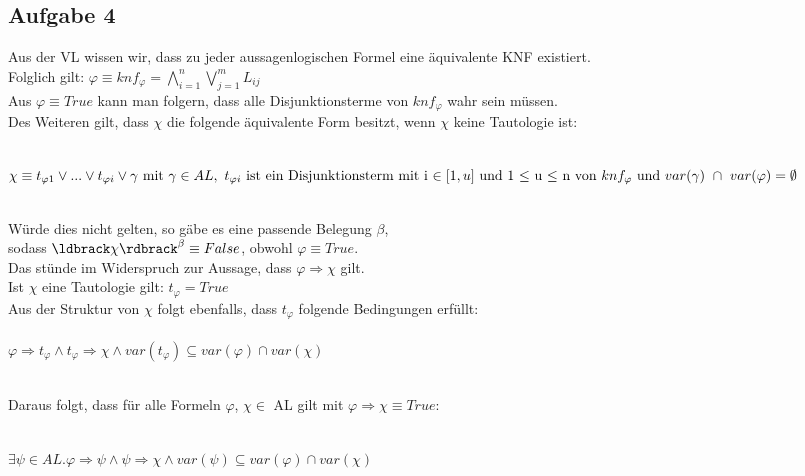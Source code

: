 \documentclass{article}
\begin{document}
\begin{Large}
	\subsection*{Aufgabe 4}
	Aus der VL wissen wir, dass zu jeder aussagenlogischen Formel eine äquivalente KNF existiert. \\
	Folglich gilt: $\varphi \equiv knf_{\varphi} = \bigwedge\limits_{i=1}^{n} \bigvee\limits_{j=1}^{m} L_{ij}$ \\
	Aus $\varphi \equiv True$ kann man folgern, dass alle Disjunktionsterme von $knf_{\varphi}$ wahr sein müssen.\\
	Des Weiteren gilt, dass $\chi$ die folgende äquivalente Form besitzt, wenn $\chi$ keine Tautologie ist:
	
	\ \\ \( \chi \equiv t_{\varphi 1} \vee ... \vee  t_{\varphi i} \vee \gamma \text{ mit } \\
	\gamma \in AL,~t_{\varphi i} \text{ ist ein Disjunktionsterm
	mit i $\in [1,u]$ und 1 $\leq$ u $\leq$ n von } \\ 
	knf_{\varphi} \text{ und } var(\gamma) ~\cap~ var(\varphi) = \emptyset \)
	
	\ \\Würde dies nicht gelten, so gäbe es eine passende Belegung $\beta$, \\
	sodass $\ldbrack \chi \rdbrack ^\beta \equiv False$, obwohl $\varphi \equiv True$. \\
	Das stünde im Widerspruch zur Aussage, dass $\varphi \Rightarrow \chi$ gilt. \\
	Ist $\chi$ eine Tautologie gilt: $t_{\varphi} = True$ \\
	Aus der Struktur von $\chi$ folgt ebenfalls, dass $t_{\varphi}$ folgende Bedingungen erfüllt:\\
	\ \\ \(\varphi \Rightarrow t_{\varphi} \wedge t_{\varphi} \Rightarrow \chi \wedge var(t_{\varphi}) \subseteq 		  	var(\varphi) \cap var(\chi) \)
	
	\ \\Daraus folgt, dass für alle Formeln $\varphi$, $\chi \in$ AL gilt mit $\varphi \Rightarrow \chi \equiv True$:
	
	\ \\ \( \exists \psi \in AL. \varphi \Rightarrow \psi \wedge 
	\psi \Rightarrow \chi \wedge var(\psi) \subseteq var(\varphi) \cap var(\chi) \)
	
	
	

	
	
	\end{Large}
\end{document}
